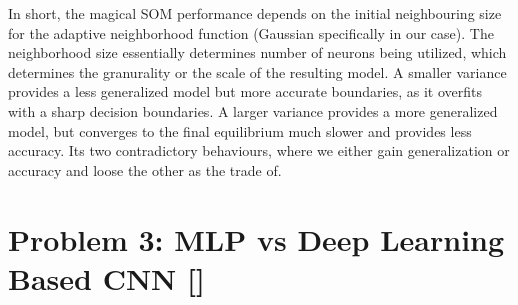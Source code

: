 \documentclass{tron}
\begin{document}
In short, the magical SOM performance depends on the initial neighbouring size for the adaptive neighborhood function (Gaussian specifically in our case). The neighborhood size essentially determines number of neurons being utilized, which determines the granurality or the scale of the resulting model. A smaller variance provides a less generalized model but more accurate boundaries, as it overfits with a sharp decision boundaries. A larger variance provides a more generalized model, but converges to the final equilibrium much slower and provides less accuracy. Its two contradictory behaviours, where we either gain generalization or accuracy and loose the other as the trade of.


\newpage
\section{Problem 3: MLP vs Deep Learning Based CNN []}

%	
%	
\end{document}
